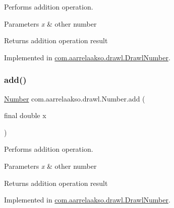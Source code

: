 Performs addition operation. 


\begin{DoxyParams}{Parameters}
{\em x} & other number \\
\hline
\end{DoxyParams}
\begin{DoxyReturn}{Returns}
addition operation result 
\end{DoxyReturn}


Implemented in \hyperlink{classcom_1_1aarrelaakso_1_1drawl_1_1_drawl_number_a484120b1cacb13f1266bf1d3f002ce3d}{com.\+aarrelaakso.\+drawl.\+Drawl\+Number}.

\mbox{\label{interfacecom_1_1aarrelaakso_1_1drawl_1_1_number_abd063ef436254888b283a30da6fff78a}} 
\subsubsection{\texorpdfstring{add()}{add()}\hspace{0.1cm}{\footnotesize\ttfamily [2/3]}}
{\footnotesize\ttfamily \hyperlink{interfacecom_1_1aarrelaakso_1_1drawl_1_1_number}{Number} com.\+aarrelaakso.\+drawl.\+Number.\+add (\begin{DoxyParamCaption}\item[{final double}]{x }\end{DoxyParamCaption})}



Performs addition operation. 


\begin{DoxyParams}{Parameters}
{\em x} & other number \\
\hline
\end{DoxyParams}
\begin{DoxyReturn}{Returns}
addition operation result 
\end{DoxyReturn}


Implemented in \hyperlink{classcom_1_1aarrelaakso_1_1drawl_1_1_drawl_number_adf7216ecb118a2bbd1d4aba6a51110bc}{com.\+aarrelaakso.\+drawl.\+Drawl\+Number}.

\mbox{\label{interfacecom_1_1aarrelaakso_1_1drawl_1_1_number_ad71ea7d41bcc751bc6e08ccd0d5f9885}} 
